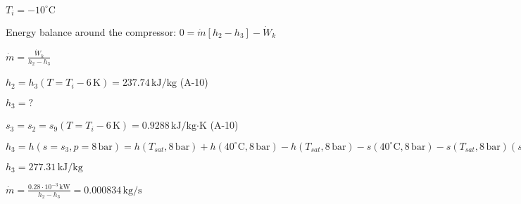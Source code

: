\( T_i = -10^\circ \text{C} \)  

Energy balance around the compressor:  
\( 0 = \dot{m} [h_2 - h_3] - \dot{W}_k \)  

\( \dot{m} = \frac{\dot{W}_k}{h_2 - h_3} \)  

\( h_2 = h_3 (T = T_i - 6 \, \text{K}) = 237.74 \, \text{kJ/kg} \) (A-10)  

\( h_3 = ? \)  

\( s_3 = s_2 = s_9 (T = T_i - 6 \, \text{K}) = 0.9288 \, \text{kJ/kg·K} \) (A-10)  

\( h_3 = h(s = s_3, p = 8 \, \text{bar}) = h(T_{sat}, 8 \, \text{bar}) + h(40^\circ \text{C}, 8 \, \text{bar}) - h(T_{sat}, 8 \, \text{bar}) - s(40^\circ \text{C}, 8 \, \text{bar}) - s(T_{sat}, 8 \, \text{bar}) (s_3 - s(T_{sat}, 8 \, \text{bar})) \)  

\( h_3 = 277.31 \, \text{kJ/kg} \)  

\( \dot{m} = \frac{0.28 \cdot 10^{-3} \, \text{kW}}{h_2 - h_3} = 0.000834 \, \text{kg/s} \)